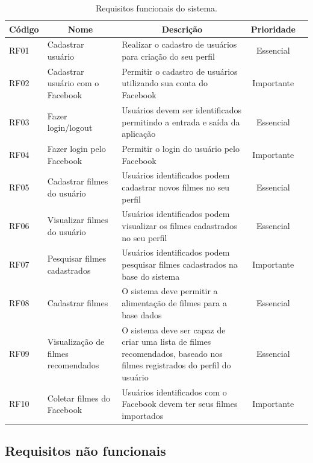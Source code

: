 \begin{table}[H]
	\label{tab:req-funcionais}
	\centering
	\caption{Requisitos funcionais do sistema.}
	\def\arraystretch{1.2} %
	\begin{tabular}{|m{1.2cm} | m{3cm} | m{7.2cm}| c | m{1.9cm}}
		\hline
		\multicolumn{1}{|c|}{\bfseries Código} & \multicolumn{1}{c|}{\bfseries Nome} & \multicolumn{1}{c|}{\bfseries Descrição} & \multicolumn{1}{c|}{\bfseries Prioridade} \\ \hline
		RF01	& Cadastrar usuário	& Realizar o cadastro de usuários para criação do seu perfil	& Essencial \\ \hline
		RF02	& Cadastrar usuário com o Facebook	& Permitir o cadastro de usuários utilizando sua conta do Facebook	& Importante \\ \hline
		RF03	& Fazer login/logout	& Usuários devem ser identificados permitindo a entrada e saída da aplicação	& Essencial \\ \hline
		RF04	& Fazer login pelo Facebook	& Permitir o login do usuário pelo Facebook	& Importante \\ \hline
		RF05	& Cadastrar filmes do usuário	& Usuários identificados podem cadastrar novos filmes no seu perfil	& Essencial \\ \hline
		RF06	& Visualizar filmes do usuário	& Usuários identificados podem visualizar os filmes cadastrados no seu perfil	& Essencial \\ \hline
		RF07	& Pesquisar filmes cadastrados	& Usuários identificados podem pesquisar filmes cadastrados na base do sistema	& Importante \\ \hline
		RF08	& Cadastrar filmes	& O sistema deve permitir a alimentação de filmes para a base dados	& Essencial \\ \hline
		RF09	& Visualização de filmes recomendados	& O sistema deve ser capaz de criar uma lista de filmes recomendados, baseado nos filmes registrados do perfil do usuário	& Essencial \\ \hline
		RF10	& Coletar filmes do Facebook	& Usuários identificados com o Facebook devem ter seus filmes importados	& Importante \\ \hline
	\end{tabular}
\end{table}

\subsection{Requisitos não funcionais}

